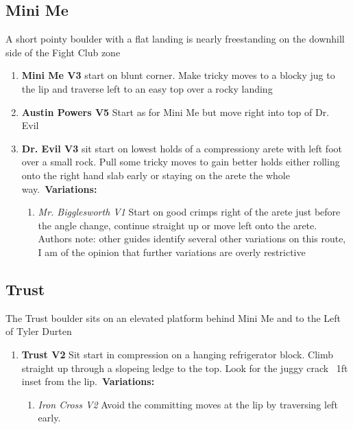 \subsection*{Mini Me}\label{bf:Mini Me}
A short pointy boulder with a flat landing is nearly freestanding on the downhill side of the Fight Club zone

\begin{enumerate}[resume]
	\item\label{rt:Mini Me} \colorbox{green!20}{\textbf{Mini Me V3  } }
	\newline start on blunt corner. Make tricky moves to a blocky jug to the lip and traverse left to an easy top over a rocky landing\
	\item\label{rt:Austin Powers} \colorbox{RoyalBlue!20}{\textbf{Austin Powers V5    } }
	\newline Start as for Mini Me but move right into top of Dr. Evil\
	\item\label{rt:Dr. Evil} \colorbox{green!20}{\textbf{Dr. Evil V3    } }
	\newline sit start on lowest holds of a compressiony arete with left foot over a small rock. Pull some tricky moves to gain better holds either rolling onto the right hand slab early or staying on the arete the whole way.\
	\newline \textbf{Variations:}
	\begin{enumerate}
		\item\label{vr:Mr. Bigglesworth} \colorbox{green!20}{\emph{Mr. Bigglesworth V1 \ding{72}  }  }
		\newline Start on good crimps right of the arete just before the angle change, continue straight up or move left onto the arete. Authors note: other guides identify several other variations on this route, I am of the opinion that further variations are overly restrictive\
	\end{enumerate}
\end{enumerate}
\subsection*{Trust}\label{bf:Trust}
The Trust boulder sits on an elevated platform behind Mini Me and to the Left of Tyler Durten

\begin{enumerate}[resume]
	\item\label{rt:Trust} \colorbox{green!20}{\textbf{Trust V2      } }
	\newline Sit start in compression on a hanging refrigerator block. Climb straight up through a slopeing ledge to the top. Look for the juggy crack ~1ft inset from the lip.\
	\newline \textbf{Variations:}
	\begin{enumerate}
		\item\label{vr:Iron Cross} \colorbox{green!20}{\emph{Iron Cross V2   }  }
		\newline Avoid the committing moves at the lip by traversing left early.\
	\end{enumerate}
\end{enumerate}
